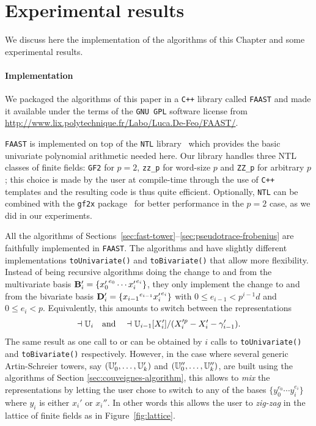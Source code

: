 \section{Experimental results}
\label{sec:artin-benchmarks}

We discuss here the implementation of the algorithms of this Chapter
and some experimental results.

\paragraph{Implementation}
We packaged the algorithms of this paper in a \texttt{C++} library
called \texttt{FAAST} and made it available under the terms of the
\texttt{GNU GPL} software license from
\url{http://www.lix.polytechnique.fr/Labo/Luca.De-Feo/FAAST/}.

\texttt{FAAST} is implemented on top of the \texttt{NTL}
library~\cite{shoup2003ntl} which provides the basic univariate
polynomial arithmetic needed here. Our library handles three NTL
classes of finite fields: {\tt GF2} for $p=2$, {\tt zz\_p} for
word-size $p$ and {\tt ZZ\_p} for arbitrary $p$; this choice is made
by the user at compile-time through the use of \texttt{C++} templates
and the resulting code is thus quite efficient.  Optionally,
\texttt{NTL} can be combined with the \texttt{gf2x}
package~\cite{gf2x} for better performance in the $p=2$ case, as we
did in our experiments.

All the algorithms of
Sections~\ref{sec:fast-tower}--\ref{sec:pseudotrace-frobenius} are
faithfully implemented in \texttt{FAAST}. The algorithms
 and  have slightly different
implementations \texttt{toUnivariate()} and \texttt{toBivariate()}
that allow more flexibility. Instead of being recursive algorithms
doing the change to and from the multivariate basis
$\mathbf{B}'_i=\{{x_0'}^{e_0}\cdots {x_i'}^{e_i}\}$, they only
implement the change to and from the bivariate basis
$\mathbf{D}'_i=\{{x_{i-1}}^{e_{i-1}}{x_i'}^{e_i}\}$ with $0\le
e_{i-1}<p^{i-1}d$ and $0\le e_i<p$. Equivalently, this amounts to
switch between the representations
\begin{equation}
  \dashv\mathbb{U}_i \quad\text{and}\quad
  \dashv\mathbb{U}_{i-1}[X_i']/(X_i'^p-X_i'-\gamma_{i-1}')
  \text{.}
\end{equation}
The same result as one call to  or
 can be obtained by $i$ calls to
\texttt{toUnivariate()} and \texttt{toBivariate()}
respectively. However, in the case where several generic Artin-Schreier
towers, say $(\mathbb{U}_0',\ldots,\mathbb{U}_k')$ and $(\mathbb{U}_0'',\ldots,\mathbb{U}_k'')$, are
built using the algorithms of Section \ref{sec:couveignes-algorithm},
this allows to \emph{mix} the representations by letting the user
chose to switch to any of the bases $\{y_0^{e_0}\cdots y_i^{e_i}\}$
where $y_i$ is either $x_i'$ or $x_i''$. In other words this allows
the user to \emph{zig-zag} in the lattice of finite fields as in
Figure~\ref{fig:lattice}.

